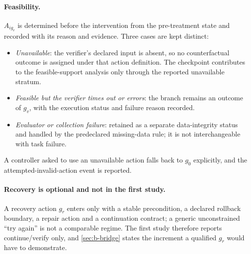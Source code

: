 \paragraph{Feasibility.}
$A_{ig_v}$ is determined before the intervention from the pre-treatment state
and recorded with its reason and evidence.  Three cases are kept distinct:
\begin{itemize}[leftmargin=1.4em]
\item \emph{Unavailable}: the verifier's declared input is absent, so no
  counterfactual outcome is assigned under that action definition.  The
  checkpoint contributes to the feasible-support analysis only through the
  reported unavailable stratum.
\item \emph{Feasible but the verifier times out or errors}: the branch remains
  an outcome of $g_v$, with the execution status and failure reason recorded.
\item \emph{Evaluator or collection failure}: retained as a separate
  data-integrity status and handled by the predeclared missing-data rule; it is
  not interchangeable with task failure.
\end{itemize}
A controller asked to use an unavailable action falls back to $g_0$ explicitly,
and the attempted-invalid-action event is reported.

\paragraph{Recovery is optional and not in the first study.}
A recovery action $g_r$ enters only with a stable precondition, a declared
rollback boundary, a repair action and a continuation contract; a generic
unconstrained ``try again'' is not a comparable regime.  The first study
therefore reports continue/verify only, and \cref{sec:b-bridge} states the
increment a qualified $g_r$ would have to demonstrate.
